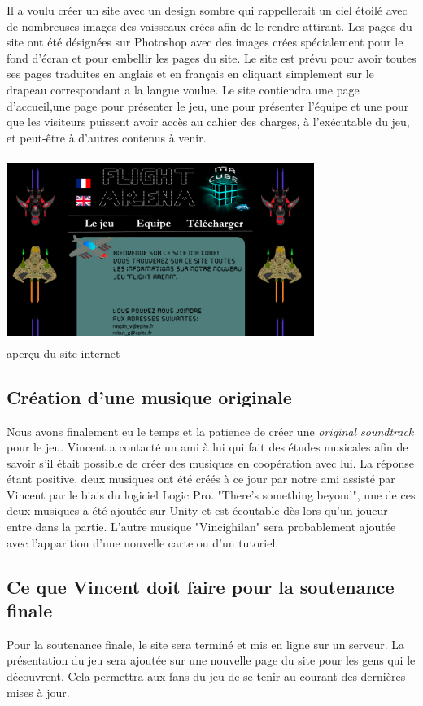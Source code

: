 \documentclass[10pt, titlepage]{report}
\begin{document}
Il a voulu créer un site avec un design sombre qui rappellerait un ciel étoilé avec de nombreuses images des vaisseaux crées afin de le rendre attirant. Les pages du site ont été désignées sur Photoshop avec des images crées spécialement pour le fond d'écran et pour embellir les pages du site. Le site est prévu pour avoir toutes ses pages traduites en anglais et en français en cliquant simplement sur le drapeau correspondant a la langue voulue. Le site contiendra une page d'accueil,une page pour présenter le jeu, une pour présenter l'équipe et une pour que les visiteurs puissent avoir accès au cahier des charges, à l'exécutable du jeu, et peut-être à d'autres contenus à venir.\\

\begin{center}
\includegraphics[height=6cm, width=10cm]{site.png}\\
aperçu du site internet
\end{center}

\subsection{Création d'une musique originale}
Nous avons finalement eu le temps et la patience de créer une \textit{original soundtrack} pour le jeu. Vincent a contacté un ami à lui qui fait des études musicales afin de savoir s'il était possible de créer des musiques en coopération avec lui. La réponse étant positive, deux musiques ont été créés à ce jour par notre ami assisté par Vincent par le biais du logiciel Logic Pro. "There's something beyond", une de ces deux musiques a été ajoutée sur Unity et est écoutable dès lors qu'un joueur entre dans la partie. L'autre musique "Vincighilan" sera probablement ajoutée avec l'apparition d'une nouvelle carte ou d'un tutoriel.

\subsection{Ce que Vincent doit faire pour la soutenance finale}
Pour la soutenance finale, le site sera terminé et mis en ligne sur un serveur. La présentation du jeu sera ajoutée sur une nouvelle page du site pour les gens qui le découvrent. Cela permettra aux fans du jeu de se tenir au courant des dernières mises à jour. \\
\end{document}
